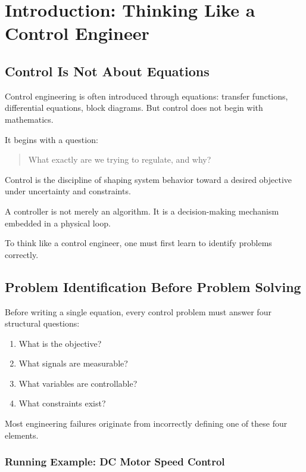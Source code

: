 
\chapter{Introduction: Thinking Like a Control Engineer}

\section{Control Is Not About Equations}

Control engineering is often introduced through equations:
transfer functions, differential equations, block diagrams.
But control does not begin with mathematics.

It begins with a question:

\begin{quote}
	What exactly are we trying to regulate, and why?
\end{quote}

Control is the discipline of shaping system behavior toward a desired objective under uncertainty and constraints.

A controller is not merely an algorithm.
It is a decision-making mechanism embedded in a physical loop.

To think like a control engineer, one must first learn to identify problems correctly.

\section{Problem Identification Before Problem Solving}

Before writing a single equation, every control problem must answer four structural questions:

\begin{enumerate}
	\item What is the objective?
	\item What signals are measurable?
	\item What variables are controllable?
	\item What constraints exist?
\end{enumerate}

Most engineering failures originate from incorrectly defining one of these four elements.

\subsection*{Running Example: DC Motor Speed Control}

